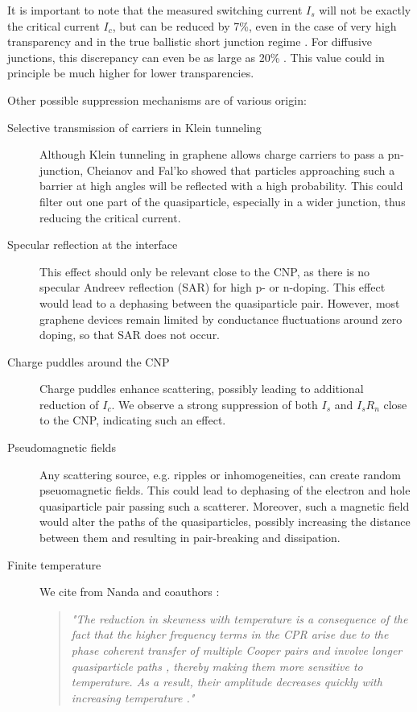 It is important to note that the measured switching current $I_s$ will not be exactly the critical current $I_c$, but can be reduced by 7\%, even in the case of very high transparency and in the true ballistic short junction regime \cite{lee_ultimately_2015}.
For diffusive junctions, this discrepancy can even be as large as 20\% \cite{ke_critical_2016}.
This value could in principle be much higher for lower transparencies.

Other possible suppression mechanisms are of various origin:
\begin{description}
	\item[Selective transmission of carriers in Klein tunneling] Although Klein tunneling in graphene allows charge carriers to pass a pn-junction, Cheianov and Fal'ko showed that particles approaching such a barrier at high angles will be reflected with a high probability.\cite{chialvoCurrentphaseRelationGraphene2010}
	This could filter out one part of the quasiparticle, especially in a wider junction, thus reducing the critical current.\cite{benshalom_quantum_2015}
	\item[Specular reflection at the interface] This effect should only be relevant close to the CNP, as there is no specular Andreev reflection (SAR) for high p- or n-doping.
	This effect would lead to a dephasing between the quasiparticle pair.
	However, most graphene devices remain limited by conductance fluctuations around zero doping, so that SAR does not occur.
	\item[Charge puddles around the CNP] Charge puddles enhance scattering, possibly leading to additional reduction of $I_c$.
	We observe a strong suppression of both $I_s$ and $I_s R_n$ close to the CNP, indicating such an effect.
	\item[Pseudomagnetic fields] Any scattering source, e.g. ripples or inhomogeneities, can create random pseuomagnetic fields.
	This could lead to dephasing of the electron and hole quasiparticle pair passing such a scatterer.
	Moreover, such a magnetic field would alter the paths of the quasiparticles, possibly increasing the distance between them and resulting in pair-breaking and dissipation.
	\item[Finite temperature] We cite from Nanda and coauthors \cite{nanda_currentphase_2017}:
	\begin{quotation}
		\textit{"The reduction in skewness with temperature is a consequence of the fact that the higher frequency terms in the CPR arise due to the phase coherent transfer of multiple Cooper pairs and involve longer quasiparticle paths \cite{heikkilaSupercurrentcarryingDensityStates2002}, thereby making them more sensitive to temperature.
			As a result, their amplitude decreases quickly with increasing temperature \cite{hagymasiJosephsonCurrentBallistic2010,black-schafferStronglyAnharmonicCurrentphase2010,rakytaMagneticFieldOscillations2016,english_observation_2016}."}
	\end{quotation}
	

\end{description}

